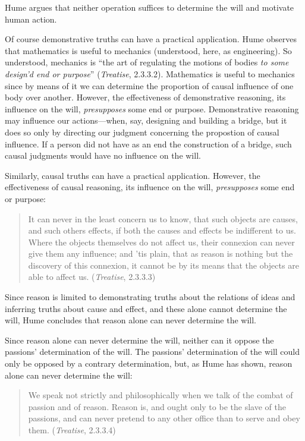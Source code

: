 Hume argues that neither operation suffices to determine the will and motivate human action.

Of course demonstrative truths can have a practical application. Hume observes that mathematics is useful to mechanics (understood, here, as engineering). So understood, mechanics is ``the art of regulating the motions of bodies \emph{to some design'd end or purpose}'' (\emph{Treatise}, 2.3.3.2). Mathematics is useful to mechanics since by means of it we can determine the proportion of causal influence of one body over another. However, the effectiveness of demonstrative reasoning, its influence on the will, \emph{presupposes} some end or purpose. Demonstrative reasoning may influence our actions---when, say, designing and building a bridge, but it does so only by directing our judgment concerning the propostion of causal influence. If a person did not have as an end the construction of a bridge, such causal judgments would have no influence on the will.

Similarly, causal truths can have a practical application. However, the effectiveness of causal reasoning, its influence on the will, \emph{presupposes} some end or purpose:

\begin{quote}
    It can never in the least concern us to know, that such objects are causes, and such others effects, if both the causes and effects be indifferent to us. Where the objects themselves do not affect us, their connexion can never give them any influence; and 'tis plain, that as reason is nothing but the discovery of this connexion, it cannot be by its means that the objects are able to affect us. (\emph{Treatise}, 2.3.3.3)
\end{quote}

Since reason is limited to demonstrating truths about the relations of ideas and inferring truths about cause and effect, and these alone cannot determine the will, Hume concludes that reason alone can never determine the will.

Since reason alone can never determine the will, neither can it oppose the passions' determination of the will. The passions' determination of the will could only be opposed by a contrary determination, but, as Hume has shown, reason alone can never determine the will:

\begin{quote}
    We speak not strictly and philosophically when we talk of the combat of passion and of reason. Reason is, and ought only to be the slave of the passions, and can never pretend to any other office than to serve and obey them. (\emph{Treatise}, 2.3.3.4)
\end{quote}

